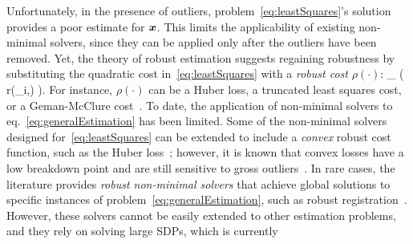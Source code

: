Unfortunately, in the presence of outliers, problem~\eqref{eq:leastSquares}'s solution provides a 
poor estimate for 
${\bm x}$. This limits the applicability of existing non-minimal solvers, 
 since they can be applied only after the outliers have been removed. 
 Yet,
 the theory of robust estimation  
 suggests regaining robustness by substituting the quadratic cost in~\eqref{eq:leastSquares} 
 with a \emph{robust cost} $\rho(\cdot)$:
%
\bea \label{eq:generalEstimation}
\min_{\vxx \in \calX} \; \sumAllPointsi \rho( r(\vy_i,\vxx) ).
\eea 
%
For instance, $\rho(\cdot)$ can be a Huber loss, a truncated least squares cost, or a Geman-McClure cost~\cite{Black96ijcv-unification}.
To date, the application of non-minimal solvers  to eq.~\eqref{eq:generalEstimation} has been limited. 
Some of the non-minimal solvers designed for~\eqref{eq:leastSquares} can be extended to include a \emph{convex} robust cost function, such as the Huber loss~\cite{Carlone18ral-robustPGO2D}; however, it is known that convex losses have a low breakdown point and are still sensitive to gross outliers~\cite{Lajoie19ral-DCGM}. 
In rare cases, the literature provides \emph{robust non-minimal solvers} that achieve 
global solutions to specific instances of problem~\eqref{eq:generalEstimation}, 
such as robust registration~\cite{Yang19rss-teaser,Yang19iccv-QUASAR}. 
However, 
these solvers cannot be easily extended to other estimation problems, and they rely on solving large SDPs, which is currently
